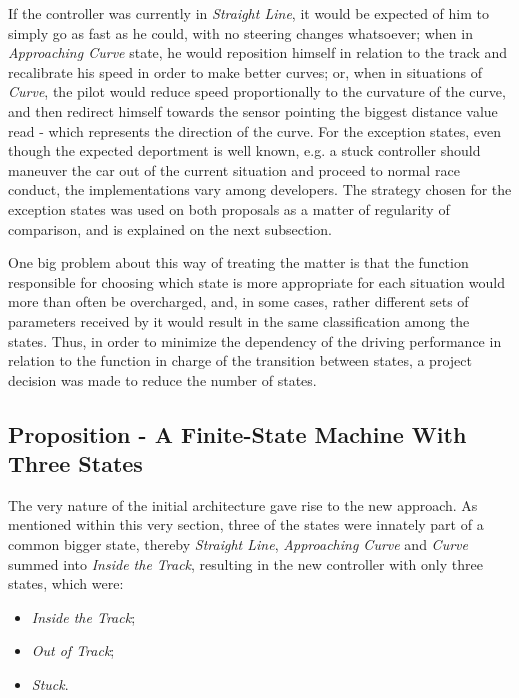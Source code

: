 	If the controller was currently in \emph{Straight Line}, it would be expected of him to simply go as fast as he
	could, with no steering changes whatsoever; when in \emph{Approaching Curve} state, he would reposition himself
	in relation to the track and recalibrate his speed in order to make better curves; or, when in situations of
	\emph{Curve}, the pilot would reduce speed proportionally to the curvature of the curve, and then redirect
	himself towards the sensor pointing the biggest distance value read - which represents the direction of the curve.
	For the exception states, even though the expected deportment is well known, e.g. a stuck controller should
	maneuver the car out of the current situation and proceed to normal race conduct, the implementations vary among
	developers. The strategy chosen for the exception states was used on both proposals as a matter of regularity of
	comparison, and is explained on the next subsection.
	
	One big problem about this way of treating the matter is that the function responsible for choosing which state
	is more appropriate for each situation would more than often be overcharged, and, in some cases, rather different
	sets of parameters received by it would result in the same classification among the states. Thus, in order to
	minimize the dependency of the driving performance in relation to the function in charge of the transition
	between states, a project decision was made to reduce the number of states.
		
	\subsection{Proposition - A Finite-State Machine With Three States}
	
	The very nature of the initial architecture gave rise to the new approach. As mentioned within this very section,
	three of the states were innately part of a common bigger state, thereby \emph{Straight Line},
	\emph{Approaching Curve} and \emph{Curve} summed into \emph{Inside the Track}, resulting in the new controller
	with only three states, which were:
	
	\begin{itemize}
		
		\item \emph{Inside the Track};
		\item \emph{Out of Track};
		\item \emph{Stuck}.
		
	\end{itemize}
	
